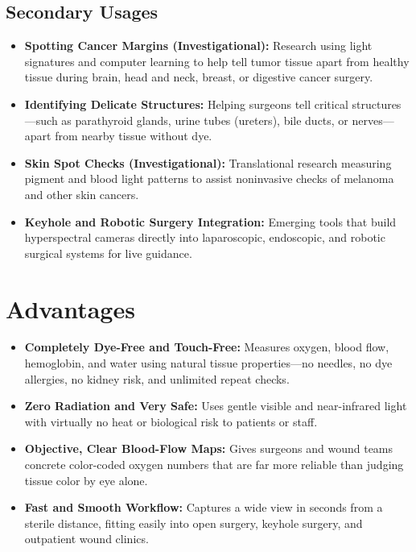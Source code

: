 \subsection{Secondary Usages}
\begin{itemize}
    \item \textbf{Spotting Cancer Margins (Investigational):} Research using light signatures and computer learning to help tell tumor tissue apart from healthy tissue during brain, head and neck, breast, or digestive cancer surgery.
    \item \textbf{Identifying Delicate Structures:} Helping surgeons tell critical structures---such as parathyroid glands, urine tubes (ureters), bile ducts, or nerves---apart from nearby tissue without dye.
    \item \textbf{Skin Spot Checks (Investigational):} Translational research measuring pigment and blood light patterns to assist noninvasive checks of melanoma and other skin cancers.
    \item \textbf{Keyhole and Robotic Surgery Integration:} Emerging tools that build hyperspectral cameras directly into laparoscopic, endoscopic, and robotic surgical systems for live guidance.
\end{itemize}

\section{Advantages}
\begin{itemize}
    \item \textbf{Completely Dye-Free and Touch-Free:} Measures oxygen, blood flow, hemoglobin, and water using natural tissue properties---no needles, no dye allergies, no kidney risk, and unlimited repeat checks.
    \item \textbf{Zero Radiation and Very Safe:} Uses gentle visible and near-infrared light with virtually no heat or biological risk to patients or staff.
    \item \textbf{Objective, Clear Blood-Flow Maps:} Gives surgeons and wound teams concrete color-coded oxygen numbers that are far more reliable than judging tissue color by eye alone.
    \item \textbf{Fast and Smooth Workflow:} Captures a wide view in seconds from a sterile distance, fitting easily into open surgery, keyhole surgery, and outpatient wound clinics.
\end{itemize}

